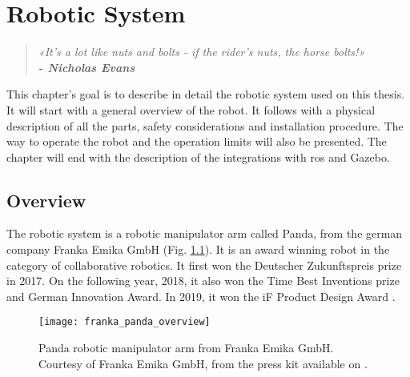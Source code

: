 \chapter{Robotic System}
\label{cha:robotic_system}

\begin{quotation}
\begin{flushright}
\itshape
«It's a lot like nuts and bolts - if the rider's nuts, the horse bolts!»\\
\textbf{- Nicholas Evans}
\end{flushright}
\end{quotation}

This chapter's goal is to describe in detail the robotic system used on this thesis. It will start with a general overview of the robot. It follows with a physical description of all the parts, safety considerations and installation procedure. The way to operate the robot and the operation limits will also be presented. The chapter will end with the description of the integrations with \gls{ros} and Gazebo.


\section{Overview}
\label{sec:robotic_system_overview}

The robotic system is a robotic manipulator arm called Panda, from the german company Franka Emika GmbH (Fig. \ref{fig:franka_panda_overview}). It is an award winning robot in the category of collaborative robotics. It first won the Deutscher Zukunftspreis prize in 2017. On the following year, 2018, it also won the Time Best Inventions prize and German Innovation Award. In 2019, it won the iF Product Design Award \cite{FrankaEmikaGmbH_official_website}. 

\begin{figure}[htbp]
	\centering
	\texttt{[image: franka\_panda\_overview]}
	\caption{Panda robotic manipulator arm from Franka Emika GmbH. Courtesy of Franka Emika GmbH, from the press kit available on \cite{FrankaEmikaGmbH_official_website}.}
	\label{fig:franka_panda_overview}
\end{figure}

